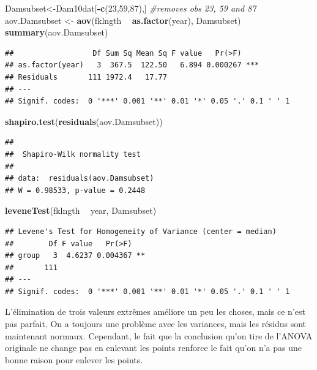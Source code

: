 \documentclass[12pt,]{book}
\newenvironment{Shaded}{\begin{snugshade}}{\end{snugshade}}
\newcommand{\CommentTok}[1]{\textcolor[rgb]{0.56,0.35,0.01}{\textit{#1}}}
\newcommand{\DecValTok}[1]{\textcolor[rgb]{0.00,0.00,0.81}{#1}}
\newcommand{\KeywordTok}[1]{\textcolor[rgb]{0.13,0.29,0.53}{\textbf{#1}}}
\newcommand{\NormalTok}[1]{#1}
\newcommand{\OperatorTok}[1]{\textcolor[rgb]{0.81,0.36,0.00}{\textbf{#1}}}
\newcommand{\StringTok}[1]{\textcolor[rgb]{0.31,0.60,0.02}{#1}}
\begin{document}
\begin{Shaded}
\begin{Highlighting}[]
\NormalTok{Damsubset<-Dam10dat[}\OperatorTok{-}\KeywordTok{c}\NormalTok{(}\DecValTok{23}\NormalTok{,}\DecValTok{59}\NormalTok{,}\DecValTok{87}\NormalTok{),] }\CommentTok{#removes obs 23, 59 and 87}
\NormalTok{aov.Damsubset <-}\StringTok{ }\KeywordTok{aov}\NormalTok{(fklngth }\OperatorTok{~}\StringTok{ }\KeywordTok{as.factor}\NormalTok{(year), Damsubset)}
\KeywordTok{summary}\NormalTok{(aov.Damsubset)}
\end{Highlighting}
\end{Shaded}

\begin{verbatim}
##                  Df Sum Sq Mean Sq F value   Pr(>F)    
## as.factor(year)   3  367.5  122.50   6.894 0.000267 ***
## Residuals       111 1972.4   17.77                     
## ---
## Signif. codes:  0 '***' 0.001 '**' 0.01 '*' 0.05 '.' 0.1 ' ' 1
\end{verbatim}

\begin{Shaded}
\begin{Highlighting}[]
\KeywordTok{shapiro.test}\NormalTok{(}\KeywordTok{residuals}\NormalTok{(aov.Damsubset))}
\end{Highlighting}
\end{Shaded}

\begin{verbatim}
## 
##  Shapiro-Wilk normality test
## 
## data:  residuals(aov.Damsubset)
## W = 0.98533, p-value = 0.2448
\end{verbatim}

\begin{Shaded}
\begin{Highlighting}[]
\KeywordTok{leveneTest}\NormalTok{(fklngth }\OperatorTok{~}\StringTok{ }\NormalTok{year, Damsubset)}
\end{Highlighting}
\end{Shaded}

\begin{verbatim}
## Levene's Test for Homogeneity of Variance (center = median)
##        Df F value   Pr(>F)   
## group   3  4.6237 0.004367 **
##       111                    
## ---
## Signif. codes:  0 '***' 0.001 '**' 0.01 '*' 0.05 '.' 0.1 ' ' 1
\end{verbatim}

L'élimination de trois valeurs extrêmes améliore un peu les choses, mais ce n'est pas parfait. On a toujours une problème avec les variances, mais les résidus sont maintenant normaux. Cependant, le fait que la conclusion qu'on tire de l'ANOVA originale ne change pas en enlevant les points renforce le fait qu'on n'a pas une bonne raison pour enlever les points.
\end{document}
